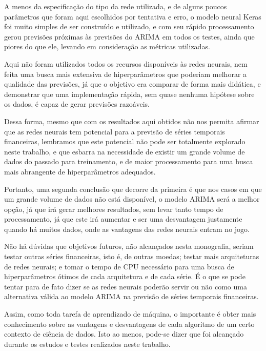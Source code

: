A menos da especificação do tipo da rede utilizada, e de alguns poucos parâmetros que foram aqui escolhidos por tentativa e erro, o modelo neural Keras foi muito simples de ser construído e utilizado, e com seu rápido processamento gerou previsões próximas às previsões do ARIMA em todos os testes, ainda que piores do que ele, levando em consideração as métricas utilizadas.

Aqui não foram utilizados todos os recursos disponíveis às redes neurais, nem feita uma busca mais extensiva de hiperparâmetros que poderiam melhorar a qualidade das previsões, já que o objetivo era comparar de forma mais didática, e demonstrar que uma implementação rápida, sem quase nenhuma hipótese sobre os dados, é capaz de gerar previsões razoáveis.

Dessa forma, mesmo que com os resultados aqui obtidos não nos permita afirmar que as redes neurais tem potencial para a previsão de séries temporais financeiras, lembramos que este potencial não pode ser totalmente explorado neste trabalho, e que esbarra na necessidade de existir um grande volume de dados do passado para treinamento, e de maior processamento para uma busca mais abrangente de hiperparâmetros adequados.

Portanto, uma segunda conclusão que decorre da primeira é que nos casos em que um grande volume de dados não está disponível, o modelo ARIMA será a melhor opção, já que irá gerar melhores resultados, sem levar tanto tempo de processamento, já que este irá aumentar e ser uma desvantagem justamente quando há muitos dados, onde as vantagens das redes neurais entram no jogo.

Não há dúvidas que objetivos futuros, não alcançados nesta monografia, seriam testar outras séries financeiras, isto é, de outras moedas; testar mais arquiteturas de redes neurais; e tomar o tempo de CPU necessário para uma busca de hiperparâmetros ótimos de cada arquitetura e de cada série. É o que se pode tentar para de fato dizer se as redes neurais poderão servir ou não como uma alternativa válida ao modelo ARIMA na previsão de séries temporais financeiras.

Assim, como toda tarefa de aprendizado de máquina, o importante é obter mais conhecimento sobre as vantagens e desvantagens de cada algoritmo de um certo contexto de ciência de dados. Isto ao menos, pode-se dizer que foi alcançado durante os estudos e testes realizados neste trabalho.